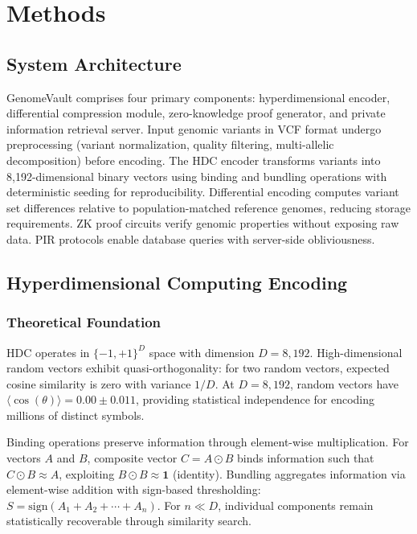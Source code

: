 \documentclass[11pt,letterpaper]{article}
\begin{document}
\section{Methods}

\subsection{System Architecture}

GenomeVault comprises four primary components: hyperdimensional encoder, differential compression module, zero-knowledge proof generator, and private information retrieval server. Input genomic variants in VCF format undergo preprocessing (variant normalization, quality filtering, multi-allelic decomposition) before encoding. The HDC encoder transforms variants into 8,192-dimensional binary vectors using binding and bundling operations with deterministic seeding for reproducibility. Differential encoding computes variant set differences relative to population-matched reference genomes, reducing storage requirements. ZK proof circuits verify genomic properties without exposing raw data. PIR protocols enable database queries with server-side obliviousness.

\subsection{Hyperdimensional Computing Encoding}

\subsubsection{Theoretical Foundation}

HDC operates in $\{-1,+1\}^D$ space with dimension $D = 8,192$. High-dimensional random vectors exhibit quasi-orthogonality: for two random vectors, expected cosine similarity is zero with variance $1/D$. At $D = 8,192$, random vectors have $\langle\cos(\theta)\rangle = 0.00 \pm 0.011$, providing statistical independence for encoding millions of distinct symbols.

Binding operations preserve information through element-wise multiplication. For vectors $A$ and $B$, composite vector $C = A \odot B$ binds information such that $C \odot B \approx A$, exploiting $B \odot B \approx \mathbf{1}$ (identity). Bundling aggregates information via element-wise addition with sign-based thresholding: $S = \text{sign}(A_1 + A_2 + \cdots + A_n)$. For $n \ll D$, individual components remain statistically recoverable through similarity search.
\end{document}
